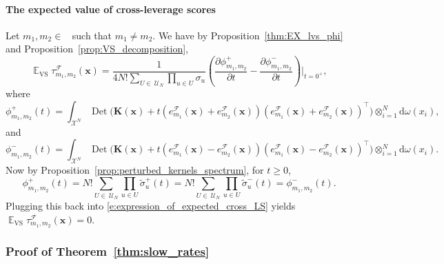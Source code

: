 \documentclass[twoside,11pt]{book}
\numberwithin{theorem}{chapter}
\numberwithin{definition}{chapter}
\numberwithin{proposition}{chapter}
\numberwithin{corollary}{chapter}
\numberwithin{example}{chapter}
\numberwithin{lemma}{chapter}
\DeclareMathOperator{\Det}{Det}
\DeclareMathOperator{\VS}{\mathrm{VS}}
\DeclareMathOperator{\Tran}{\intercal}
\DeclareMathOperator{\EX}{\mathbb{E}}
\DeclareMathOperator{\F}{\mathcal{F}}
\DeclareMathOperator{\Ns}{\mathbb{N}^{*}}
\def\UN{\:\mathcal{U}_N}
\newcommand{\rb}[1]{\textcolor{magenta}{#1}}
\begin{document}
\paragraph{The expected value of cross-leverage scores}
Let $m_{1},m_{2} \in \Ns$ such that $m_{1} \neq m_{2}$. We have by Proposition~\ref{thm:EX_lvs_phi} and Proposition~\ref{prop:VS_decomposition},
\begin{equation}
\EX_{\VS} \tau_{m_{1},m_{2}}^{\F}(\bm{x})  = \frac{1}{4N!\sum\limits_{U\in\UN} \prod\limits_{u \in U}\sigma_{u}} \left( \frac{\partial \phi_{m_{1},m_{2}}^{+}}{ \partial t } - \frac{\partial \phi_{m_{1},m_{2}}^{-}}{ \partial t }\right)\bigg|_{t = 0^{+}} ,
\label{e:expression_of_expected_cross_LS}
\end{equation}
where
\begin{equation}
\phi_{m_{1},m_{2}}^{+}(t) =  \int_{\mathcal{X}^{N}} \Det \bigg(\bm{K}(\bm{x})+t \left(e_{m_{1}}^{\mathcal{F}}(\bm{x}) + e_{m_{2}}^{\mathcal{F}}(\bm{x}) \right) \left(e_{m_{1}}^{\mathcal{F}}(\bm{x}) + e_{m_{2}}^{\mathcal{F}}(\bm{x}) \right)^{\Tran} \bigg) \otimes_{i =1}^{N} \mathrm{d}\omega(x_{i}),
\end{equation}
and
\begin{equation}
\phi_{m_{1},m_{2}}^{-}(t) =  \int_{\mathcal{X}^{N}} \Det \bigg(\bm{K}(\bm{x})+t \left(e_{m_{1}}^{\mathcal{F}}(\bm{x}) - e_{m_{2}}^{\mathcal{F}}(\bm{x}) \right) \left(e_{m_{1}}^{\mathcal{F}}(\bm{x}) - e_{m_{2}}^{\mathcal{F}}(\bm{x}) \right)^{\Tran} \bigg) \otimes_{i =1}^{N} \mathrm{d}\omega(x_{i}).
\end{equation}
Now by Proposition~\ref{prop:perturbed_kernels_spectrum}, for $t\geq 0$,
\begin{equation}
\phi_{m_{1},m_{2}}^{+}(t) = N!\sum\limits_{U\in\UN} \prod\limits_{u \in U} \tilde{\sigma}_{u}^{+}(t) = N!\sum\limits_{U\in\UN} \prod\limits_{u \in U} \tilde{\sigma}_{u}^{-}(t) = \phi_{m_{1},m_{2}}^{-}(t).
\end{equation}
Plugging this back into \eqref{e:expression_of_expected_cross_LS} yields $\EX_{\VS} \tau_{m_{1},m_{2}}^{\F}(\bm{x}) = 0$.

\subsubsection{Proof of Theorem~\ref{thm:slow_rates}}\label{app:proof_slow_rates}
\end{document}
